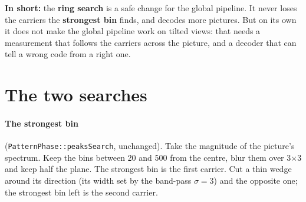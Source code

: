 \documentclass[10pt,a4paper]{article}
\newcommand{\maxs}{\textcolor{maxorange}{\textbf{strongest bin}}}
\newcommand{\ring}{\textcolor{ringblue}{\textbf{ring search}}}
\begin{document}
\textbf{In short:} the \ring{} is a safe change for the global pipeline. It
never loses the carriers the \maxs{} finds, and decodes more pictures. But on
its own it does not make the global pipeline work on tilted views: that needs
a measurement that follows the carriers across the picture, and a decoder that
can tell a wrong code from a right one.

\section{The two searches}

\paragraph{The \maxs} (\texttt{PatternPhase::peaksSearch}, unchanged). Take the
magnitude of the picture's spectrum. Keep the bins between 20 and 500 from the
centre, blur them over 3$\times$3 and keep half the plane. The strongest bin is
the first carrier. Cut a thin wedge around its direction (its width set by the
band-pass $\sigma = 3$) and the opposite one; the strongest bin left is the
second carrier.
\end{document}
